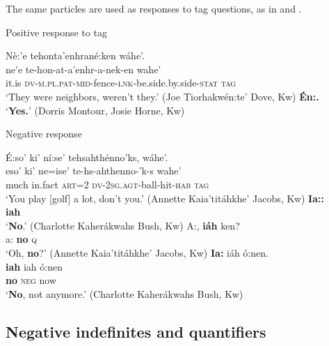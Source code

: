 \documentclass[output=paper,colorlinks,citecolor=brown]{langscibook}
\begin{document}
The same particles are used as responses to tag questions, as in  and .

\ea\label{ex:moh:66}Positive response to tag \\
\begin{xlist}
    \label{ex:moh:a}
        \glll Nè:’e tehonta’enhrané:ken wáhe’.  \\ 
              ne’e te-hon-at-a’enhr-a-nek-en wahe’ \\
              it.is \textsc{dv-m.pl.pat-mid-}fence-\textsc{lnk-}be.side.by.side-\textsc{stat} \textsc{tag}\\
        \glt ‘They were neighbors, weren’t they.’ (Joe Tiorhakwén:te’ Dove, Kw)
    \label{ex:moh:b}\medskip
        \gl \textbf{Én:.} \\
        \glt ‘\textbf{Yes.}’ (Dorris Montour, Josie Horne, Kw)
\end{xlist}
\z 

{\ea\label{ex:moh:67} Negative response\\
\begin{xlist}[CKB:]
    \label{ex:moh:67a}
        \glll É:so’ ki’ ní:se’ tehsahthénno’ks, wáhe’. \\ 
              eso’ ki’ ne=ise’ te-hs-ahthenno-’k-s wahe’ \\
              much in.fact \textsc{art=2} \textsc{dv-2sg.agt}-ball-hit-\textsc{hab} \textsc{tag}\\
        \glt ‘You play [golf] a lot, don’t you.’ (Annette Kaia’titáhkhe’ Jacobs, Kw)
    \label{ex:moh:67b}\medskip
        \gll \textbf{Ia::} \\
             \textbf{iah} \\
        \glt ‘\textbf{No}.’ (Charlotte Kaherákwahs Bush, Kw)
    \label{ex:moh:67c}\medskip
        \gll A:, \textbf{iáh} ken? \\
             a: \textbf{no} \textsc{q} \\
        \glt ‘Oh, \textbf{no}?’ (Annette Kaia’titáhkhe’ Jacobs, Kw)
    \label{ex:moh:67d}\medskip
        \glll \textbf{Ia:} iáh ó:nen. \\
             \textbf{iah} iah ó:nen \\
             \textbf{no} \textsc{neg} now\\
        \glt ‘\textbf{No}, not anymore.’ (Charlotte Kaherákwahs Bush, Kw)
\end{xlist}
\z }

\subsection{Negative indefinites and quantifiers}\label{sec:moh:3.2}
\end{document}
